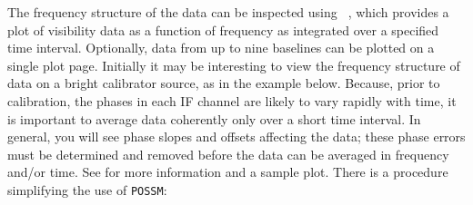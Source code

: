 The frequency structure of the data can be inspected using {\tt
{}}, which provides a plot of visibility data as a function
of frequency as integrated over a specified time interval.  Optionally,
data from up to nine baselines can be plotted on a single plot page.
Initially it may be interesting to view the frequency structure of
data on a bright calibrator source, as in the example below.  Because,
prior to calibration, the phases in each IF channel are likely to vary
rapidly with time, it is important to average data coherently only
over a short time interval.  In general, you will see phase slopes and
offsets affecting the data; these phase errors must be determined and
removed before the data can be averaged in frequency and/or time.  See
 for more information and a sample plot.  There is a
procedure simplifying the use of {\tt POSSM}:
\pd

